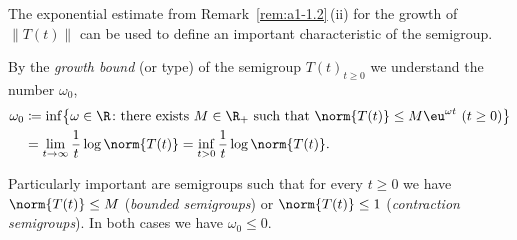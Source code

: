 The exponential estimate from Remark~\ref{rem:a1-1.2}\,(ii) for the growth of\/ $ \lVert T(t) \rVert $ can be used to define an important characteristic of the semigroup.
\begin{definition}\label{def:a1-1.3}
By the \emph{growth bound} (or type) of the semigroup $ T(t)_{t\geq0} $ we understand the number $ \omega_{0} $,
\begin{equation}\label{eq:a1-1.1}
\begin{aligned}
    \omega_{0} & \coloneqq \inf \bigl\{ \omega \in \R \colon \text{there exists } %
         M \in \R_{+} \text{ such that }
        \norm{T(t)} \leq M \eu^{\omega t} \ (t \geq 0) \bigr\} \\
    & = \lim_{t\to\infty} \frac{1}{t}\log\norm{T(t)}
      = \inf_{t>0} \frac{1}{t}\log\norm{T(t)} .
\end{aligned}
\end{equation}
\end{definition}
Particularly important are semigroups such that for every $t \geq 0$ we have $\norm{T(t)} \leq M$ (\emph{bounded semigroups}) or $\norm{T(t)} \leq 1$ (\emph{contraction semigroups}).
In both cases we have $\omega_{0} \leq 0$.

